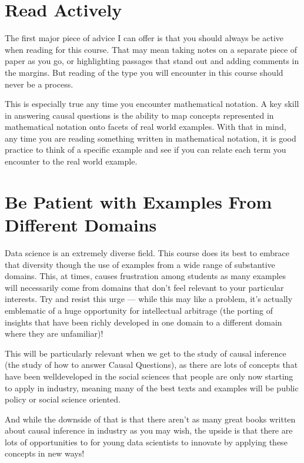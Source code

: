\documentclass[letterpaper,10pt,english]{jupyterBook}
\begin{document}
\section{Read Actively}
\label{\detokenize{40_in_practice/00_how_to_read_this_book:read-actively}}
\sphinxAtStartPar
The first major piece of advice I can offer is that you should always be active when reading for this course. That may mean taking notes on a separate piece of paper as you go, or highlighting passages that stand out and adding comments in the margins. But reading of the type you will encounter in this course should never be a  process.

\sphinxAtStartPar
This is especially true any time you encounter mathematical notation. A key skill in answering causal questions is the ability to map concepts represented in mathematical notation onto facets of real world examples. With that in mind, any time you are reading something written in mathematical notation, it is good practice to think of a specific example and see if you can relate each term you encounter to the real world example.


\section{Be Patient with Examples From Different Domains}
\label{\detokenize{40_in_practice/00_how_to_read_this_book:be-patient-with-examples-from-different-domains}}
\sphinxAtStartPar
Data science is an extremely diverse field. This course does its best to embrace that diversity though the use of examples from a wide range of substantive domains. This, at times, causes frustration among students as many examples will necessarily come from domains that don’t feel relevant to your particular interests. Try and resist this urge — while this may  like a problem, it’s actually emblematic of a huge opportunity for intellectual arbitrage (the porting of insights that have been richly developed in one domain to a different domain where they are unfamiliar)!

\sphinxAtStartPar
This will be particularly relevant when we get to the study of causal inference (the study of how to answer Causal Questions), as there are lots of concepts that have been well\sphinxhyphen{}developed in the social sciences that people are only now starting to apply in industry, meaning many of the best texts and examples will be public policy or social science oriented.

\sphinxAtStartPar
And while the downside of that is that there aren’t as many great books written about causal inference in industry as you may wish, the upside is that there are lots of opportunities to for young data scientists to innovate by applying these concepts in new ways!
\end{document}
